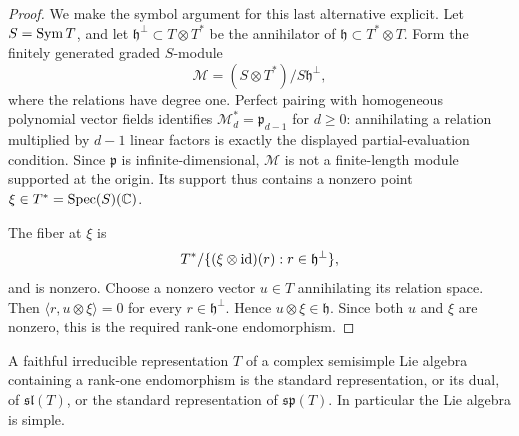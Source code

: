 \begin{proof}
We make the symbol argument for this last alternative explicit.
Let $S=\operatorname{Sym} T$, and let
$\mathfrak h^\perp\subset T\otimes T^*$ be the annihilator of
$\mathfrak h\subset T^*\otimes T$.  Form the finitely generated
graded $S$-module
\[
 \mathcal M=(S\otimes T^*)/
                    S\mathfrak h^\perp,
\]
where the relations have degree one.  Perfect pairing with
homogeneous polynomial vector fields identifies
$\mathcal M_d^*=\mathfrak p_{d-1}$ for $d\ge0$:
annihilating a relation multiplied by $d-1$ linear factors is
exactly the displayed partial-evaluation condition.  Since
$\mathfrak p$ is infinite-dimensional, $\mathcal M$ is not a
finite-length module supported at the origin.  Its support thus
contains a nonzero point $\xi\in T^*=\operatorname{Spec}(S)(\mathbb C)$.

The fiber at $\xi$ is
\[
 T^*/\{(\xi\otimes\operatorname{id})(r):r\in\mathfrak h^\perp\},
\]
and is nonzero.  Choose a nonzero vector $u\in T$ annihilating
its relation space.  Then
$\langle r,u\otimes\xi\rangle=0$ for every
$r\in\mathfrak h^\perp$.  Hence $u\otimes\xi\in\mathfrak h$.
Since both $u$ and $\xi$ are nonzero, this is the required
rank-one endomorphism.
\end{proof}

\begin{lemma}
\label{loc:rank-one-classification}
A faithful irreducible representation $T$ of a complex semisimple
Lie algebra containing a rank-one endomorphism is the standard
representation, or its dual, of $\mathfrak{sl}(T)$, or the
standard representation of $\mathfrak{sp}(T)$.  In particular the
Lie algebra is simple.
\end{lemma}

